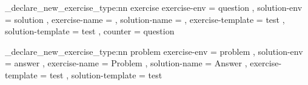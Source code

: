\xsim_declare_new_exercise_type:nn {exercise}
  {
    exercise-env = question ,
    solution-env = solution ,
    exercise-name = \questionname ,
    solution-name = \solutionname ,
    exercise-template = test ,
    solution-template = test ,
    counter = question
  }

\xsim_declare_new_exercise_type:nn {problem}
  {
    exercise-env = problem ,
    solution-env = answer ,
    exercise-name = Problem ,
    solution-name = Answer ,
    exercise-template = test ,
    solution-template = test
  }

